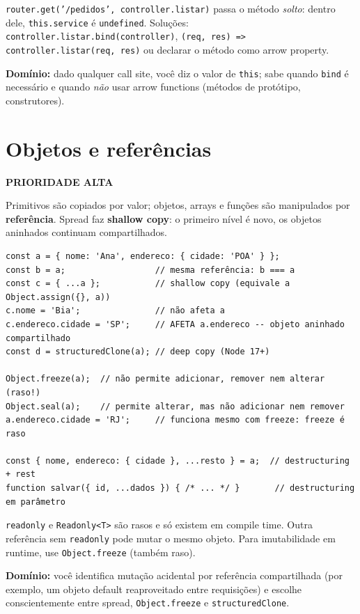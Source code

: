 \documentclass[12pt,a4paper,oneside]{book}
\newcommand{\alta}{\colorbox{red!15}{\sffamily\scriptsize\bfseries PRIORIDADE ALTA}}
\newcommand{\code}[1]{\texttt{#1}}
\newcommand{\dom}[1]{\begin{dominio}\textbf{Domínio:} #1\end{dominio}}
\begin{document}
\begin{cuidado}
\code{router.get('/pedidos', controller.listar)} passa o método \emph{solto}: dentro dele, \code{this.service} é \code{undefined}. Soluções: \code{controller.listar.bind(controller)}, \code{(req, res) => controller.listar(req, res)} ou declarar o método como arrow property.
\end{cuidado}

\dom{dado qualquer call site, você diz o valor de \code{this}; sabe quando \code{bind} é necessário e quando \emph{não} usar arrow functions (métodos de protótipo, construtores).}

\section{Objetos e referências}
\label{sec:objetos}
\alta

Primitivos são copiados por valor; objetos, arrays e funções são manipulados por \textbf{referência}. Spread faz \textbf{shallow copy}: o primeiro nível é novo, os objetos aninhados continuam compartilhados.

\begin{verbatim}
const a = { nome: 'Ana', endereco: { cidade: 'POA' } };
const b = a;                  // mesma referência: b === a
const c = { ...a };           // shallow copy (equivale a Object.assign({}, a))
c.nome = 'Bia';               // não afeta a
c.endereco.cidade = 'SP';     // AFETA a.endereco -- objeto aninhado compartilhado
const d = structuredClone(a); // deep copy (Node 17+)

Object.freeze(a);  // não permite adicionar, remover nem alterar (raso!)
Object.seal(a);    // permite alterar, mas não adicionar nem remover
a.endereco.cidade = 'RJ';     // funciona mesmo com freeze: freeze é raso

const { nome, endereco: { cidade }, ...resto } = a;  // destructuring + rest
function salvar({ id, ...dados }) { /* ... */ }       // destructuring em parâmetro
\end{verbatim}

\begin{nota}
\code{readonly} e \code{Readonly<T>} são rasos e só existem em compile time. Outra referência sem \code{readonly} pode mutar o mesmo objeto. Para imutabilidade em runtime, use \code{Object.freeze} (também raso).
\end{nota}

\dom{você identifica mutação acidental por referência compartilhada (por exemplo, um objeto default reaproveitado entre requisições) e escolhe conscientemente entre spread, \code{Object.freeze} e \code{structuredClone}.}
\end{document}
